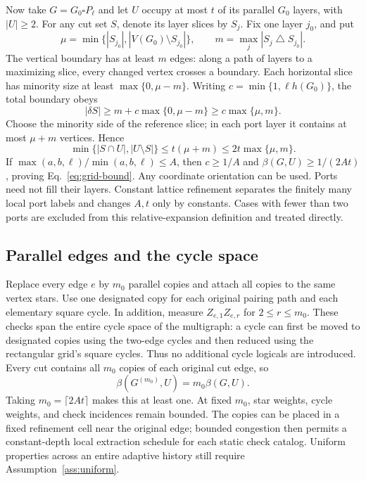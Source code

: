 Now take $G=G_0\square P_\ell$ and let $U$ occupy at most $t$ of its
parallel $G_0$ layers, with $|U|\ge2$. For any cut set $S$, denote its
layer slices by $S_j$. Fix one layer $j_0$, and put
\begin{equation}
 \mu=\min\{|S_{j_0}|,|V(G_0)\setminus S_{j_0}|\},\qquad
 m=\max_j|S_j\mathbin\triangle S_{j_0}|.
\end{equation}
The vertical boundary has at least $m$ edges: along a path of layers
to a maximizing slice, every changed vertex crosses a boundary.
Each horizontal slice has minority size at least $\max\{0,\mu-m\}$.
Writing $c=\min\{1,\ell h(G_0)\}$, the total boundary obeys
\begin{equation}
 |\delta S|\ge m+c\max\{0,\mu-m\}\ge c\max\{\mu,m\}.
\end{equation}
Choose the minority side of the reference slice; in each port layer it
contains at most $\mu+m$ vertices. Hence
\begin{equation}
 \min\{|S\cap U|,|U\setminus S|\}
       \le t(\mu+m)\le2t\max\{\mu,m\}.
\end{equation}
If $\max(a,b,\ell)/\min(a,b,\ell)\le A$, then
$c\ge1/A$ and $\beta(G,U)\ge1/(2At)$, proving
Eq.~\eqref{eq:grid-bound}. Any coordinate orientation can be used.
Ports need not fill their layers. Constant lattice refinement separates
the finitely many local port labels and changes $A,t$ only by constants.
Cases with fewer than two ports are excluded from this relative-expansion
definition and treated directly.

\subsection{Parallel edges and the cycle space}
Replace every edge $e$ by $m_0$ parallel copies and attach all copies to
the same vertex stars. Use one designated copy for each original pairing
path and each elementary square cycle. In addition, measure
$Z_{e,1}Z_{e,r}$ for $2\le r\le m_0$. These checks span the entire
cycle space of the multigraph: a cycle can first be moved to designated
copies using the two-edge cycles and then reduced using the rectangular
grid's square cycles. Thus no additional cycle logicals are introduced.
Every cut contains all $m_0$ copies of each original cut edge, so
\begin{equation}
 \beta(G^{(m_0)},U)=m_0\beta(G,U).
\end{equation}
Taking $m_0=\lceil2At\rceil$ makes this at least one. At fixed $m_0$,
star weights, cycle weights, and check incidences remain bounded. The
copies can be placed in a fixed refinement cell near the original edge;
bounded congestion then permits a constant-depth local extraction schedule
for each static check catalog. Uniform properties across an entire adaptive
history still require Assumption~\ref{ass:uniform}.

